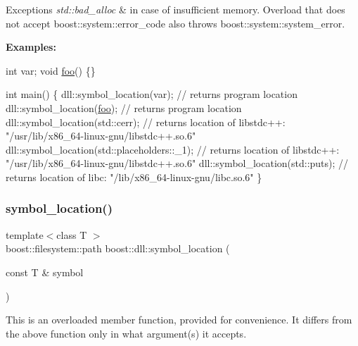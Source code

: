 \begin{DoxyExceptions}{Exceptions}
{\em std\+::bad\+\_\+alloc} & in case of insufficient memory. Overload that does not accept boost\+::system\+::error\+\_\+code also throws boost\+::system\+::system\+\_\+error.\\
\hline
\end{DoxyExceptions}
{\bfseries Examples\+:} 
\begin{DoxyCode}
\textcolor{keywordtype}{int} var;
\textcolor{keywordtype}{void} \hyperlink{a01792}{foo}() \{\}

\textcolor{keywordtype}{int} main() \{
   dll::symbol\_location(var);                     \textcolor{comment}{// returns program location}
   dll::symbol\_location(\hyperlink{a01792}{foo});                     \textcolor{comment}{// returns program location}
   dll::symbol\_location(std::cerr);               \textcolor{comment}{// returns location of libstdc++:
       "/usr/lib/x86\_64-linux-gnu/libstdc++.so.6"}
   dll::symbol\_location(std::placeholders::\_1);   \textcolor{comment}{// returns location of libstdc++:
       "/usr/lib/x86\_64-linux-gnu/libstdc++.so.6"}
   dll::symbol\_location(std::puts);               \textcolor{comment}{// returns location of libc:
       "/lib/x86\_64-linux-gnu/libc.so.6"}
\}
\end{DoxyCode}
 \mbox{\label{a00266_file_ada9f78ac87565980f6c639f3b2e30892}} 
\subsubsection{\texorpdfstring{symbol\+\_\+location()}{symbol\_location()}\hspace{0.1cm}{\footnotesize\ttfamily [2/2]}}
{\footnotesize\ttfamily template$<$class T $>$ \\
boost\+::filesystem\+::path boost\+::dll\+::symbol\+\_\+location (\begin{DoxyParamCaption}\item[{const T \&}]{symbol }\end{DoxyParamCaption})\hspace{0.3cm}{\ttfamily [inline]}}

This is an overloaded member function, provided for convenience. It differs from the above function only in what argument(s) it accepts. \mbox{\label{a00266_file_a1a70f04489d9c27a7c12a663681a2557}} 
